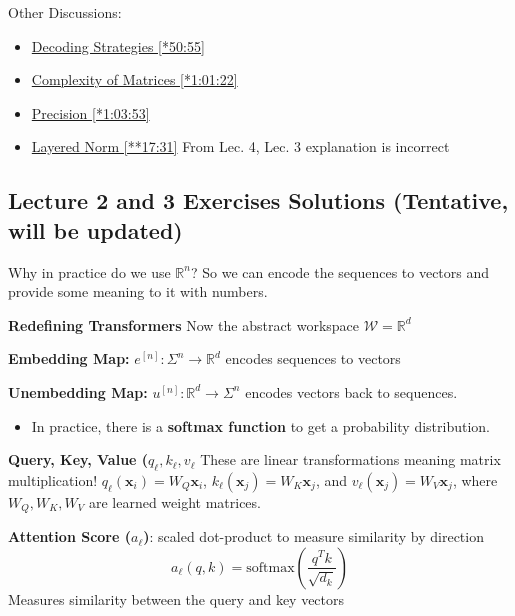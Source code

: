 \documentclass[12pt, twoside]{article}
\begin{document}
Other Discussions:
\begin{itemize}
    \item \href{https://youtu.be/1u6h3Nm3NvM?si=DPbOrvmmc-rPRJFs&t=3055}{Decoding Strategies [*50:55]}
    \item \href{https://youtu.be/1u6h3Nm3NvM?si=vG1ilQpx0IZ3sRSs&t=3682}{Complexity of Matrices [*1:01:22]}
    \item \href{https://youtu.be/1u6h3Nm3NvM?si=9r417PXiPrKnlHgQ&t=3833}{Precision [*1:03:53]}
    \item \href{https://youtu.be/2MRAX8EdBA8?si=O1TxoxJ9oHUUIL8z&t=1051}{Layered Norm [**17:31]} From Lec. 4, Lec. 3 explanation is incorrect
\end{itemize}


\newpage

\subsection*{Lecture 2 and 3 Exercises Solutions \small (Tentative, will be updated)}

\begin{soln}

Why in practice do we use $\mathbb{R}^n$? So we can encode the sequences to vectors and provide some meaning to it with numbers.

\textbf{Redefining Transformers}
Now the abstract workspace $\mathcal{W}=\mathbb{R}^d$

\textbf{Embedding Map:} $e^{[n]}: \Sigma^n \to \mathbb{R}^d$ encodes sequences to vectors

\textbf{Unembedding Map:} $u^{[n]}: \mathbb{R}^d \to \Sigma^n$ encodes vectors back to sequences.
\begin{itemize}
    \item In practice, there is a \textbf{softmax function} to get a probability distribution.
\end{itemize}

\textbf{Query, Key, Value ($q_\ell, k_\ell, v_\ell$} These are linear transformations meaning matrix multiplication! $q_\ell(\mathbf{x}_i) = W_Q \mathbf{x}_i$, $k_\ell(\mathbf{x}_j) = W_K \mathbf{x}_j$, and $v_\ell(\mathbf{x}_j) = W_V \mathbf{x}_j$, where $W_Q, W_K, W_V$ are learned weight matrices.

\textbf{Attention Score ($a_\ell$)}: scaled dot-product to measure similarity by direction
\[ a_\ell(q,k) = \text{softmax}\left(\frac{q^T k}{\sqrt{d_k}}\right) \]
Measures similarity between the query and key vectors

\end{soln}
\end{document}
